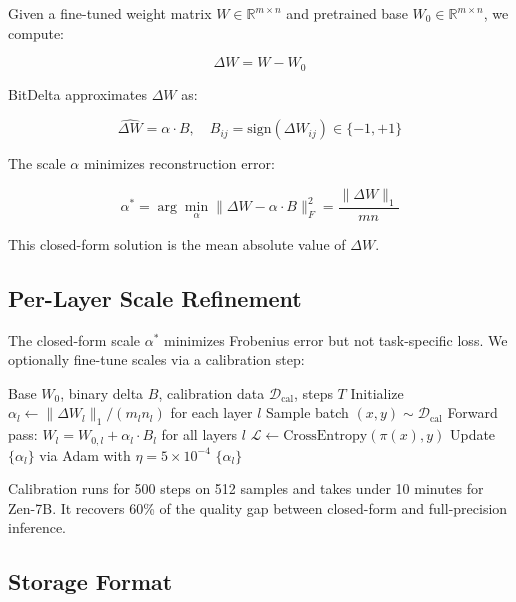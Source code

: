 \documentclass[11pt,a4paper]{article}
\begin{document}
Given a fine-tuned weight matrix $W \in \mathbb{R}^{m \times n}$ and pretrained base
$W_0 \in \mathbb{R}^{m \times n}$, we compute:

\begin{equation}
\Delta W = W - W_0
\end{equation}

BitDelta approximates $\Delta W$ as:

\begin{equation}
\hat{\Delta W} = \alpha \cdot B, \quad B_{ij} = \text{sign}(\Delta W_{ij}) \in \{-1, +1\}
\end{equation}

The scale $\alpha$ minimizes reconstruction error:

\begin{equation}
\alpha^* = \arg\min_\alpha \|\Delta W - \alpha \cdot B\|_F^2 = \frac{\|\Delta W\|_1}{mn}
\end{equation}

This closed-form solution is the mean absolute value of $\Delta W$.

\subsection{Per-Layer Scale Refinement}

The closed-form scale $\alpha^*$ minimizes Frobenius error but not task-specific
loss. We optionally fine-tune scales via a calibration step:

\begin{algorithm}[H]
\caption{BitDelta Scale Calibration}
\begin{algorithmic}[1]
\REQUIRE Base $W_0$, binary delta $B$, calibration data $\mathcal{D}_\text{cal}$, steps $T$
\STATE Initialize $\alpha_l \leftarrow \|\Delta W_l\|_1 / (m_l n_l)$ for each layer $l$
  \STATE Sample batch $(x, y) \sim \mathcal{D}_\text{cal}$
  \STATE Forward pass: $W_l = W_{0,l} + \alpha_l \cdot B_l$ for all layers $l$
  \STATE $\mathcal{L} \leftarrow \text{CrossEntropy}(\pi(x), y)$
  \STATE Update $\{\alpha_l\}$ via Adam with $\eta = 5\times10^{-4}$
\ENDFOR
\RETURN $\{\alpha_l\}$
\end{algorithmic}
\end{algorithm}

Calibration runs for 500 steps on 512 samples and takes under 10 minutes for Zen-7B.
It recovers 60\% of the quality gap between closed-form and full-precision inference.

\subsection{Storage Format}
\end{document}
